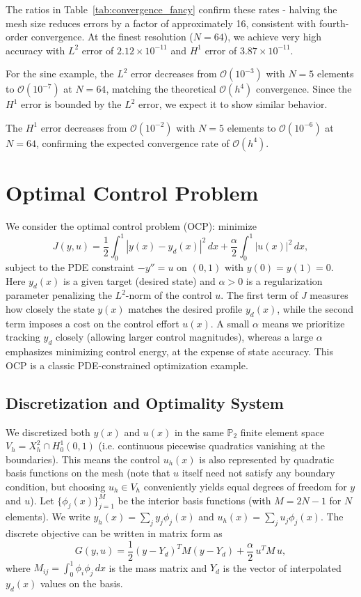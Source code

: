 \documentclass[a4paper,10pt]{article}
\begin{document}
The ratios in Table~\ref{tab:convergence_fancy} confirm these rates - halving the mesh size reduces errors by a factor of approximately 16, consistent with fourth-order convergence. At the finest resolution ($N=64$), we achieve very high accuracy with $L^2$ error of $2.12 \times 10^{-11}$ and $H^1$ error of $3.87 \times 10^{-11}$.

For the sine example, the $L^2$ error decreases from $\mathcal{O}(10^{-3})$ with $N=5$ elements to $\mathcal{O}(10^{-7})$ at $N=64$, matching the theoretical $\mathcal{O}(h^4)$ convergence.
Since the $H^1$ error is bounded by the $L^2$ error, we expect it to show similar behavior.

The $H^1$ error decreases from $\mathcal{O}(10^{-2})$ with $N=5$ elements to $\mathcal{O}(10^{-6})$ at $N=64$, confirming the expected convergence rate of $\mathcal{O}(h^4)$.


\section{Optimal Control Problem}
\label{sec:optimal_control}
We consider the optimal control problem (OCP): minimize
\[
	J(y,u) = \frac{1}{2}\int_0^1 |y(x)-y_d(x)|^2\,dx + \frac{\alpha}{2}\int_0^1 |u(x)|^2\,dx,
\]
subject to the PDE constraint $-y'' = u$ on $(0,1)$ with $y(0)=y(1)=0$. Here $y_d(x)$ is a given target (desired state) and $\alpha>0$ is a regularization parameter penalizing the $L^2$-norm of the control $u$. The first term of $J$ measures how closely the state $y(x)$ matches the desired profile $y_d(x)$, while the second term imposes a cost on the control effort $u(x)$. A small $\alpha$ means we prioritize tracking $y_d$ closely (allowing larger control magnitudes), whereas a large $\alpha$ emphasizes minimizing control energy, at the expense of state accuracy. This OCP is a classic PDE-constrained optimization example.

\subsection{Discretization and Optimality System}

We discretized both $y(x)$ and $u(x)$ in the same $\mathbb{P}_2$ finite element space $V_h = X_h^2 \cap H_0^1(0,1)$ (i.e. continuous piecewise quadratics vanishing at the boundaries). This means the control $u_h(x)$ is also represented by quadratic basis functions on the mesh (note that $u$ itself need not satisfy any boundary condition, but choosing $u_h\in V_h$ conveniently yields equal degrees of freedom for $y$ and $u$). Let $\{\phi_j(x)\}_{j=1}^{M}$ be the interior basis functions (with $M=2N-1$ for $N$ elements). We write $y_h(x)=\sum_j y_j\phi_j(x)$ and $u_h(x)=\sum_j u_j\phi_j(x)$. The discrete objective can be written in matrix form as
\[
	G(y,u) = \frac{1}{2}(y-Y_d)^T M(y-Y_d) + \frac{\alpha}{2}\,u^T M\,u,
\]
where $M_{ij}=\int_0^1 \phi_i\phi_j\,dx$ is the mass matrix and $Y_d$ is the vector of interpolated $y_d(x)$ values on the basis.
\end{document}
